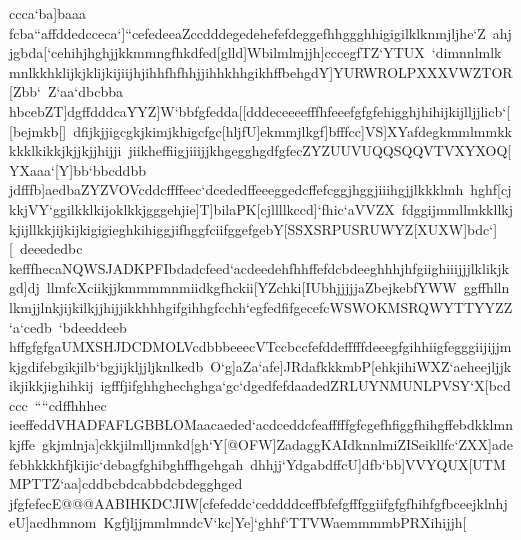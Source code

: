 {{{ ccca`ba]baaa}
 \hbox{fcba``affddedcceca`]``cefedeeaZccdddegedehefefdeggefhhggghhigigilklknmjljhe`Z%
 ahjjgbda[`cehihjhghjjkkmmngfhkdfed[glld]Wbilmlmjjh]cccegfTZ`YTUX%
 `dimnnlmlkmnlkkhklijkjklijkijiijhjihhfhfhhjjihhkhhgikhffbehgdY]YURWROLPXXXVWZTOR[Zbb`%
 Z`aa`dbcbba}
 \hbox{hbcebZT]dgffdddcaYYZ]W`bbfgfedda[[dddeceeeefffhfeeefgfgfehigghjhihijkijlljjlicb`[[bejmkb[]%
 dfijkjjigcgkjkimjkhigcfgc[hljfU]ekmmjlkgf]bfffcc]VS]XYafdegkmmlmmkkkkklkikkjkjjkjjhijji%
 jiikheffiigjiiijjkhgegghgdfgfecZYZUUVUQQSQQVTVXYXOQ[YXaaa`[Y]bb`bbcddbb}
 \hbox{jdfffb]aedbaZYZVOVcddcffffeec`dcededffeeeggedcffefcggjhggjiiihgjjlkkklmh%
 hghf[cjkkjVY`ggilkklkijoklkkjgggehjie]T]bilaPK[cjllllkccd]`fhic`aVVZX%
 fdggijmmllmkkllkjkjijllkkjijkijkigigieghkihiggjifhggfciifggefgebY[SSXSRPUSRUWYZ[XUXW]bdc`][%
 deeededbc}
 \hbox{kefffhecaNQWSJADKPFIbdadcfeed`acdeedehfhhffefdcbdeeghhhjhfgiighiiijjjlklikjkgd]dj%
 llmfcXciikjjkmmmmnmiidkgfhckii[YZchki[IUbhjjjjjaZbejkebfYWW%
 ggffhllnlkmjjlnkjijkilkjjhijjikkhhhgifgihhgfcchh`egfedfifgecefcWSWOKMSRQWYTTYYZZ`a`cedb%
 `bdeeddeeb}
 \hbox{hffgfgfgaUMXSHJDCDMOLVcdbbbeeecVTccbccfefddefffffdeeegfgihhiigfegggiijijjmkjgdifebgikjilb`bgjijkljjljknlkedb%
 O`g]aZa`afe]JRdafkkkmbP[ehkjihiWXZ`aeheejljjkikjikkjighihkij%
 igfffjifghhghechghga`gc`dgedfefdaadedZRLUYNMUNLPVSY`X[bcdccc%
 ````cdffhhhec}
 \hbox{ieeffeddVHADFAFLGBBLOMaacaeded`acdceddcfeafffffgfcgefhfiggfhihgffebdkklmnkjffe%
 gkjmlnja]ckkjilmlljmnkd[gh`Y[@OFW]ZadaggKAIdknnlmiZISeikllfc`ZXX]adefebhkkkhfjkijic`debagfghibghffhgehgah%
 dhhjj`YdgabdffcU]dfb`bb]VVYQUX[UTMMPTTZ`aa]cddbcbdcabbdcbdegghged}
 \hbox{jfgfefecE@@@AABIHKDCJIW[cfefeddc`ceddddceffbfefgfffggiifgfgfhihfgfbceejklnhjeU]acdhmnom%
 KgfjljjmmlmndcV`kc]Ye]`ghhf`TTVWaemmmmbPRXihijjh[%
}}}
